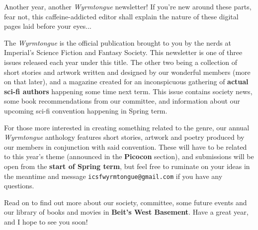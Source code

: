 Another year, another \textit{Wyrmtongue} newsletter! If you're new around these parts, fear not, this caffeine-addicted editor shall explain the nature of these digital pages laid before your eyes...

The \textit{Wyrmtongue} is the official publication brought to you by the nerds at Imperial's Science Fiction and Fantasy Society. This newsletter is one of three issues released each year under this title. The other two being a collection of short stories and artwork written and designed by our wonderful members (more on that later), and a magazine created for an inconspicuous gathering of \textbf{actual sci-fi authors} happening some time next term\footnotemark[2]{}. This issue contains society news, some book recommendations from our committee, and information about our upcoming sci-fi convention happening in Spring term.

For those more interested in creating something related to the genre, our annual \textit{Wyrmtongue} anthology features short stories, artwork and poetry produced by our members in conjunction with said convention. These will have to be related to this year's theme (announced in the \textbf{Picocon} section), and submissions will be open from the \textbf{start of Spring term}, but feel free to ruminate on your ideas in the meantime and message \texttt{icsfwyrmtongue@gmail.com} if you have any questions.

Read on to find out more about our society, committee, some future events and our library of books and movies in \textbf{Beit's West Basement}. Have a great year, and I hope to see you soon!